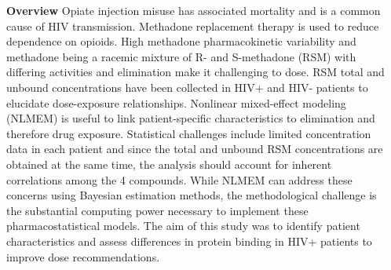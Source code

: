 \documentclass[final]{beamer}
\newlength{\sepwidth}
\newlength{\colwidth}
\newcommand{\separatorcolumn}{\begin{column}{\sepwidth}\end{column}}
\begin{document}
\begin{frame}[t]
\begin{columns}[t]
\separatorcolumn

\begin{column}{\colwidth}

  \begin{block}{\textbf{Overview}}
Opiate injection misuse has associated mortality and is a common cause of HIV transmission.  Methadone replacement therapy is used to reduce dependence on opioids. High methadone pharmacokinetic variability and methadone being a racemic mixture of R- and S-methadone (RSM) with differing activities and elimination make it challenging to dose. RSM total and unbound concentrations have been collected in HIV+ and HIV- patients to elucidate dose-exposure relationships. Nonlinear mixed-effect modeling (NLMEM) is useful to link patient-specific characteristics to elimination and therefore drug exposure. Statistical challenges include limited concentration data in each patient and since the total and unbound RSM concentrations are obtained at the same time, the analysis should account for inherent correlations among the 4 compounds. While NLMEM can address these concerns using Bayesian estimation methods, the methodological challenge is the substantial computing power necessary to implement these pharmacostatistical models. The aim of this study was to identify patient characteristics and assess differences in protein binding in HIV+ patients to improve dose recommendations.


\end{block}
\end{column}
\end{columns}
\end{frame}
\end{document}
